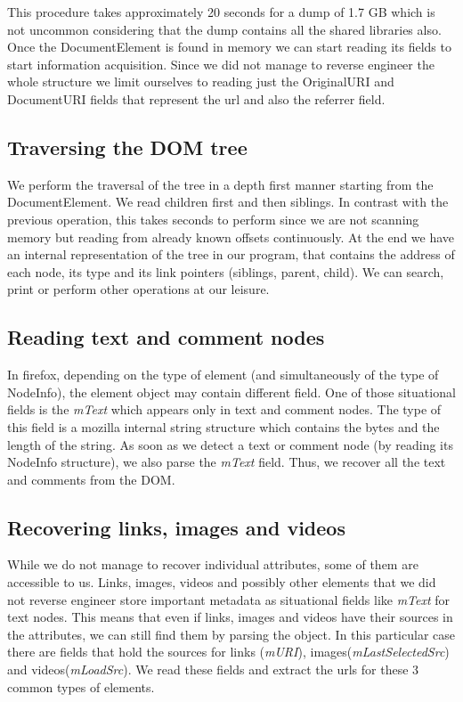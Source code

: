This procedure takes approximately 20 seconds for a dump of 1.7 GB which is not uncommon considering that the dump contains all the shared libraries also. Once the DocumentElement is found in memory we can start reading its fields to start information acquisition. Since we did not manage to reverse engineer the whole structure we limit ourselves to reading just the OriginalURI and DocumentURI fields that represent the url and also the referrer field.

\subsection{Traversing the DOM tree}
We perform the traversal of the tree in a depth first manner starting from the DocumentElement. We read children first and then siblings. In contrast with the previous operation, this takes seconds to perform since we are not scanning memory but reading from already known offsets continuously. At the end we have an internal representation of the tree in our program, that contains the address of each node, its type and its link pointers (siblings, parent, child). We can search, print or perform other operations at our leisure.

\subsection{Reading text and comment nodes}
In firefox, depending on the type of element (and simultaneously of the type of NodeInfo), the element object may contain different field. One of those situational fields is the \textit{mText} which appears only in text and comment nodes. The type of this field is a mozilla internal string structure which contains the bytes and the length of the string. As soon as we detect a text or comment node (by reading its NodeInfo structure), we also parse the \textit{mText} field. Thus, we recover all the text and comments from the DOM.

\subsection{Recovering links, images and videos}
While we do not manage to recover individual attributes, some of them are accessible to us. Links, images, videos and possibly other elements that we did not reverse engineer store important metadata as situational fields like \textit{mText} for text nodes. This means that even if links, images and videos have their sources in the attributes, we can still find them by parsing the object. In this particular case there are fields that hold the sources for links (\textit{mURI}), images(\textit{mLastSelectedSrc}) and videos(\textit{mLoadSrc}). We read these fields and extract the urls for these 3 common types of elements.

